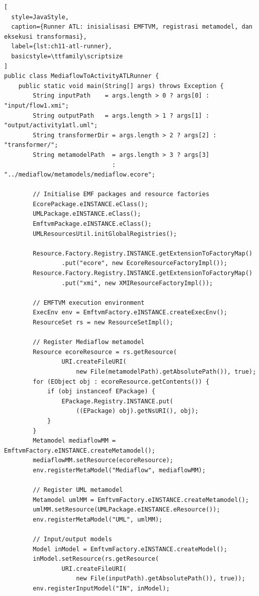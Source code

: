 \begin{lstlisting}[
  style=JavaStyle,
  caption={Runner ATL: inisialisasi EMFTVM, registrasi metamodel, dan eksekusi transformasi},
  label={lst:ch11-atl-runner},
  basicstyle=\ttfamily\scriptsize
]
public class MediaflowToActivityATLRunner {
    public static void main(String[] args) throws Exception {
        String inputPath    = args.length > 0 ? args[0] : "input/flow1.xmi";
        String outputPath   = args.length > 1 ? args[1] : "output/activity1atl.uml";
        String transformerDir = args.length > 2 ? args[2] : "transformer/";
        String metamodelPath  = args.length > 3 ? args[3]
                              : "../mediaflow/metamodels/mediaflow.ecore";

        // Initialise EMF packages and resource factories
        EcorePackage.eINSTANCE.eClass();
        UMLPackage.eINSTANCE.eClass();
        EmftvmPackage.eINSTANCE.eClass();
        UMLResourcesUtil.initGlobalRegistries();

        Resource.Factory.Registry.INSTANCE.getExtensionToFactoryMap()
                .put("ecore", new EcoreResourceFactoryImpl());
        Resource.Factory.Registry.INSTANCE.getExtensionToFactoryMap()
                .put("xmi", new XMIResourceFactoryImpl());

        // EMFTVM execution environment
        ExecEnv env = EmftvmFactory.eINSTANCE.createExecEnv();
        ResourceSet rs = new ResourceSetImpl();

        // Register Mediaflow metamodel
        Resource ecoreResource = rs.getResource(
                URI.createFileURI(
                    new File(metamodelPath).getAbsolutePath()), true);
        for (EObject obj : ecoreResource.getContents()) {
            if (obj instanceof EPackage) {
                EPackage.Registry.INSTANCE.put(
                    ((EPackage) obj).getNsURI(), obj);
            }
        }
        Metamodel mediaflowMM = EmftvmFactory.eINSTANCE.createMetamodel();
        mediaflowMM.setResource(ecoreResource);
        env.registerMetaModel("Mediaflow", mediaflowMM);

        // Register UML metamodel
        Metamodel umlMM = EmftvmFactory.eINSTANCE.createMetamodel();
        umlMM.setResource(UMLPackage.eINSTANCE.eResource());
        env.registerMetaModel("UML", umlMM);

        // Input/output models
        Model inModel = EmftvmFactory.eINSTANCE.createModel();
        inModel.setResource(rs.getResource(
                URI.createFileURI(
                    new File(inputPath).getAbsolutePath()), true));
        env.registerInputModel("IN", inModel);


\end{lstlisting}
